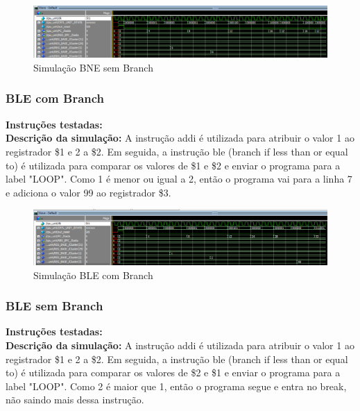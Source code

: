 \begin{figure}[htbp!]
\centering
\includegraphics[width=1\textwidth]{figure/simulacao_bne_sem_branch.png}
\caption{Simulação BNE sem Branch} 
\label{fig:imagem_massa}
\end{figure}

\subsubsection{BLE com Branch}
\textbf{Instruções testadas:}
 \\

\textbf{Descrição da simulação:} A instrução addi é utilizada para atribuir o valor 1 ao registrador \$1 e 2 a \$2. Em seguida, a instrução ble (branch if less than or equal to) é utilizada para comparar os valores de \$1 e \$2 e enviar o programa para a label "LOOP". Como 1 é menor ou igual a 2, então o programa vai para a linha 7 e adiciona o valor 99 ao registrador \$3.\\

\begin{figure}[htbp!]
\centering
\includegraphics[width=1\textwidth]{figure/simulacao_ble_com_branch.png}
\caption{Simulação BLE com Branch} 
\label{fig:imagem_massa}
\end{figure}

\subsubsection{BLE sem Branch}
\textbf{Instruções testadas:}
 \\

\textbf{Descrição da simulação:} A instrução addi é utilizada para atribuir o valor 1 ao registrador \$1 e 2 a \$2. Em seguida, a instrução ble (branch if less than or equal to) é utilizada para comparar os valores de \$2 e \$1 e enviar o programa para a label "LOOP". Como 2 é maior que 1, então o programa segue e entra no break, não saindo mais dessa instrução. \\

